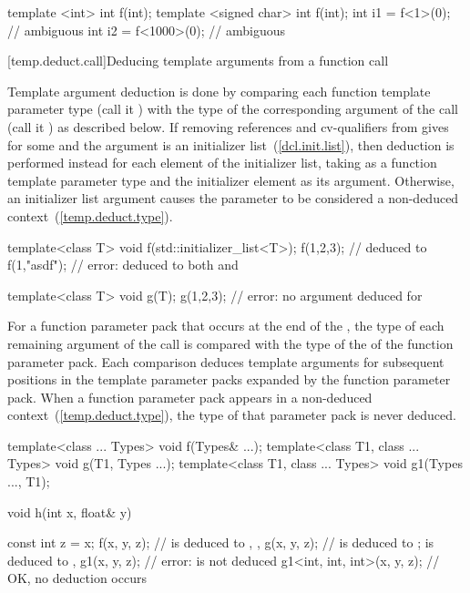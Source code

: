 \begin{codeblock}
template <int> int f(int);
template <signed char> int f(int);
int i1 = f<1>(0);               // ambiguous
int i2 = f<1000>(0);            // ambiguous
\end{codeblock}
\exitexample

[temp.deduct.call]{Deducing template arguments from a function call}

\pnum
Template argument deduction is done by comparing each function
template parameter type (call it
)
with the type of the corresponding argument of the call (call it
)
as described below.
If removing references and cv-qualifiers from  gives
 for some  and the
argument is an initializer list~(\ref{dcl.init.list}), then deduction is
performed instead for each element of the initializer list, taking
 as a function template parameter type and the initializer
element as its argument. Otherwise, an initializer list argument causes the
parameter to be considered a non-deduced context~(\ref{temp.deduct.type}).
\enterexample
\begin{codeblock}
template<class T> void f(std::initializer_list<T>);
f({1,2,3});                 //  deduced to 
f({1,"asdf"});              // error:  deduced to both  and 

template<class T> void g(T);
g({1,2,3});                 // error: no argument deduced for 
\end{codeblock}
\exitexample
For a function parameter pack that occurs at the end of the ,
the type  of each
remaining argument of the call is compared with the type 
of the  of the function parameter pack.
Each comparison deduces template arguments for subsequent positions in
the template parameter packs expanded by the function parameter pack.
When a function parameter pack appears in a non-deduced
context~(\ref{temp.deduct.type}), the type of that parameter pack is
never deduced.
\enterexample

\begin{codeblock}
template<class ... Types> void f(Types& ...);
template<class T1, class ... Types> void g(T1, Types ...);
template<class T1, class ... Types> void g1(Types ..., T1);

void h(int x, float& y) {
  const int z = x;
  f(x, y, z);                  //  is deduced to , , 
  g(x, y, z);                  //  is deduced to ;  is deduced to , 
  g1(x, y, z);                 // error:  is not deduced
  g1<int, int, int>(x, y, z);  // OK, no deduction occurs

}
\end{codeblock}

